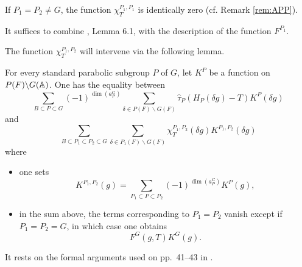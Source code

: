 \begin{paragr}
\begin{remarque}\label{rem:chinul}
If $P_1=P_2\neq G$, the function $\chi_T^{P_1,P_1}$ is identically zero (cf. Remark \ref{rem:APP}).
\end{remarque}

\begin{preuve}
It suffices to combine \cite{ar1}, Lemma 6.1, with the description of the function $F^{P_1}$.
\end{preuve}

The function $\chi_T^{P_1,P_2}$ will intervene via the following lemma.

\begin{lemme}[Arthur]\label{lem:arthur-decomp}
For every standard parabolic subgroup $P$ of $G$, let $K^P$ be a function on $P(F)\backslash G(\mathbb{A})$. One has the equality between
$$\sum_{B\subset P\subset G} (-1)^{\dim(a_P^G)} \sum_{\delta\in P(F)\backslash G(F)} \hat{\tau}_P(H_P(\delta g)-T)K^P(\delta g)$$
and
$$\sum_{B\subset P_1\subset P_2\subset G} \sum_{\delta\in P_1(F)\backslash G(F)} \chi_T^{P_1,P_2}(\delta g)K^{P_1,P_2}(\delta g)$$
where
\begin{itemize}
\item[--] one sets
\begin{equation}
  \label{eq:KP1P2-arthur}
  K^{P_1,P_2}(g)=\sum_{P_1\subset P\subset P_2} (-1)^{\dim(a_P^G)}K^P(g),
\end{equation}
\item[--] in the sum above, the terms corresponding to $P_1=P_2$ vanish except if $P_1=P_2=G$, in which case one obtains
$$F^G(g,T)K^G(g).$$
\end{itemize}
\end{lemme}

\begin{preuve}
It rests on the formal arguments used on pp.~41--43 in \cite{ar-intro}.
\end{preuve}
\end{paragr}

